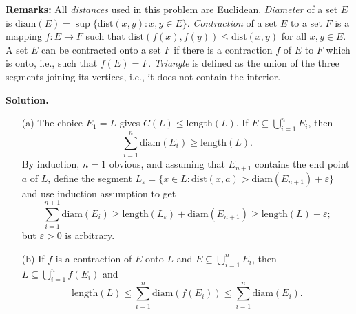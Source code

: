 \documentclass{article}
\begin{document}
\textbf{Remarks:} All \textit{distances} used in this problem are Euclidean. \textit{Diameter} of a set \( E \) is \( \text{diam}(E) = \sup\{\text{dist}(x,y) : x, y \in E\} \). \textit{Contraction} of a set \( E \) to a set \( F \) is a mapping \( f : E \to F \) such that \( \text{dist}(f(x), f(y)) \leq \text{dist}(x, y) \) for all \( x, y \in E \). A set \( E \) can be contracted onto a set \( F \) if there is a contraction \( f \) of \( E \) to \( F \) which is onto, i.e., such that \( f(E) = F \). \textit{Triangle} is defined as the union of the three segments joining its vertices, i.e., it does not contain the interior.

\textbf{Solution.}
\begin{itemize}
    \item[(a)] The choice \( E_1 = L \) gives \( C(L) \leq \text{length}(L) \). If \( E \subseteq \bigcup_{i=1}^{n} E_i \), then
    \[
    \sum_{i=1}^{n} \text{diam}(E_i) \geq \text{length}(L).
    \]
    By induction, \( n=1 \) obvious, and assuming that \( E_{n+1} \) contains the end point \( a \) of \( L \), define the segment \( L_{\varepsilon} = \{x \in L : \text{dist}(x, a) > \text{diam}(E_{n+1})+\varepsilon\} \) and use induction assumption to get
    \[
    \sum_{i=1}^{n+1} \text{diam}(E_i) \geq \text{length}(L_{\varepsilon}) + \text{diam}(E_{n+1}) \geq \text{length}(L) - \varepsilon;
    \]
    but \( \varepsilon > 0 \) is arbitrary.

    \item[(b)] If \( f \) is a contraction of \( E \) onto \( L \) and \( E \subseteq \bigcup_{i=1}^{n} E_i \), then \( L \subseteq \bigcup_{i=1}^{n} f(E_i) \) and
    \[
    \text{length}(L) \leq \sum_{i=1}^{n} \text{diam}(f(E_i)) \leq \sum_{i=1}^{n} \text{diam}(E_i).
    \]


\end{itemize}
\end{document}
